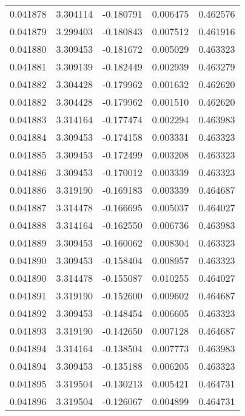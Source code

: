 \begin{tabular}{lrrrr}
0.041878    &  3.304114 & -0.180791 &  0.006475 &             0.462576 \\
0.041879    &  3.299403 & -0.180843 &  0.007512 &             0.461916 \\
0.041880    &  3.309453 & -0.181672 &  0.005029 &             0.463323 \\
0.041881    &  3.309139 & -0.182449 &  0.002939 &             0.463279 \\
0.041882    &  3.304428 & -0.179962 &  0.001632 &             0.462620 \\
0.041882    &  3.304428 & -0.179962 &  0.001510 &             0.462620 \\
0.041883    &  3.314164 & -0.177474 &  0.002294 &             0.463983 \\
0.041884    &  3.309453 & -0.174158 &  0.003331 &             0.463323 \\
0.041885    &  3.309453 & -0.172499 &  0.003208 &             0.463323 \\
0.041886    &  3.309453 & -0.170012 &  0.003339 &             0.463323 \\
0.041886    &  3.319190 & -0.169183 &  0.003339 &             0.464687 \\
0.041887    &  3.314478 & -0.166695 &  0.005037 &             0.464027 \\
0.041888    &  3.314164 & -0.162550 &  0.006736 &             0.463983 \\
0.041889    &  3.309453 & -0.160062 &  0.008304 &             0.463323 \\
0.041890    &  3.309453 & -0.158404 &  0.008957 &             0.463323 \\
0.041890    &  3.314478 & -0.155087 &  0.010255 &             0.464027 \\
0.041891    &  3.319190 & -0.152600 &  0.009602 &             0.464687 \\
0.041892    &  3.309453 & -0.148454 &  0.006605 &             0.463323 \\
0.041893    &  3.319190 & -0.142650 &  0.007128 &             0.464687 \\
0.041894    &  3.314164 & -0.138504 &  0.007773 &             0.463983 \\
0.041894    &  3.309453 & -0.135188 &  0.006205 &             0.463323 \\
0.041895    &  3.319504 & -0.130213 &  0.005421 &             0.464731 \\
0.041896    &  3.319504 & -0.126067 &  0.004899 &             0.464731 \\

\end{tabular}
